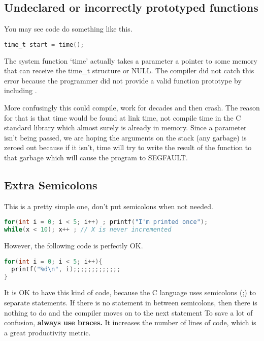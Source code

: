 \subsection{Undeclared or incorrectly prototyped functions}

You may see code do something like this.

\begin{lstlisting}[language=C]
time_t start = time();
\end{lstlisting}

The system function `time' actually takes a parameter a pointer to some memory that can receive the time\_t structure or NULL.
The compiler did not catch this error because the programmer did not provide a valid function prototype by including .

More confusingly this could compile, work for decades and then crash.
The reason for that is that time would be found at link time, not compile time in the C standard library which almost surely is already in memory.
Since a parameter isn't being passed, we are hoping the arguments on the stack (any garbage) is zeroed out because if it isn't, time will try to write the result of the function to that garbage which will cause the program to SEGFAULT.

\subsection{Extra Semicolons}

This is a pretty simple one, don't put semicolons when not needed.

\begin{lstlisting}[language=C]
for(int i = 0; i < 5; i++) ; printf("I'm printed once");
while(x < 10); x++ ; // X is never incremented
\end{lstlisting}

However, the following code is perfectly OK.

\begin{lstlisting}[language=C]
for(int i = 0; i < 5; i++){
  printf("%d\n", i);;;;;;;;;;;;;
}
\end{lstlisting}

It is OK to have this kind of code, because the C language uses semicolons (;) to separate statements.
If there is no statement in between semicolons, then there is nothing to do and the compiler moves on to the next statement
To save a lot of confusion, \textbf{always use braces.}
It increases the number of lines of code, which is a great productivity metric.


